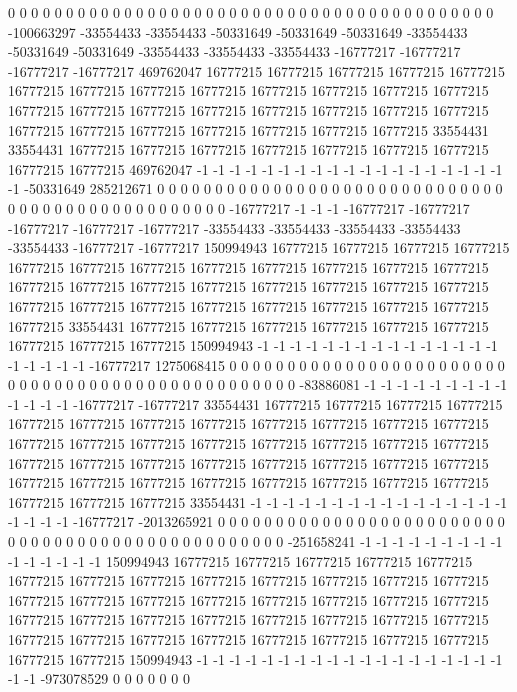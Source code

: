 0 0 0 0 0 0 0 0 0 0 0 0 0 0 0 0 0 0 0 0 0 0 0 0 0 0 0 0 0 0 0 0 0 0 0 0 0 0 0 0 0 0 -100663297 -33554433 -33554433 -50331649 -50331649 -50331649 -33554433 -50331649 -50331649 -33554433 -33554433 -33554433 -16777217 -16777217 -16777217 -16777217 469762047 16777215 16777215 16777215 16777215 16777215 16777215 16777215 16777215 16777215 16777215 16777215 16777215 16777215 16777215 16777215 16777215 16777215 16777215 16777215 16777215 16777215 16777215 16777215 16777215 16777215 16777215 16777215 16777215 33554431 33554431 16777215 16777215 16777215 16777215 16777215 16777215 16777215 16777215 16777215 469762047 -1 -1 -1 -1 -1 -1 -1 -1 -1 -1 -1 -1 -1 -1 -1 -1 -1 -1 -1 -1 -50331649 285212671 0 0 0 0 0 0 0
0 0 0 0 0 0 0 0 0 0 0 0 0 0 0 0 0 0 0 0 0 0 0 0 0 0 0 0 0 0 0 0 0 0 0 0 0 0 0 0 0 0 -16777217 -1 -1 -1 -16777217 -16777217 -16777217 -16777217 -16777217 -33554433 -33554433 -33554433 -33554433 -33554433 -16777217 -16777217 150994943 16777215 16777215 16777215 16777215 16777215 16777215 16777215 16777215 16777215 16777215 16777215 16777215 16777215 16777215 16777215 16777215 16777215 16777215 16777215 16777215 16777215 16777215 16777215 16777215 16777215 16777215 16777215 16777215 16777215 33554431 16777215 16777215 16777215 16777215 16777215 16777215 16777215 16777215 16777215 150994943 -1 -1 -1 -1 -1 -1 -1 -1 -1 -1 -1 -1 -1 -1 -1 -1 -1 -1 -1 -1 -16777217 1275068415 0 0 0 0 0 0 0
0 0 0 0 0 0 0 0 0 0 0 0 0 0 0 0 0 0 0 0 0 0 0 0 0 0 0 0 0 0 0 0 0 0 0 0 0 0 0 0 0 0 -83886081 -1 -1 -1 -1 -1 -1 -1 -1 -1 -1 -1 -1 -1 -16777217 -16777217 33554431 16777215 16777215 16777215 16777215 16777215 16777215 16777215 16777215 16777215 16777215 16777215 16777215 16777215 16777215 16777215 16777215 16777215 16777215 16777215 16777215 16777215 16777215 16777215 16777215 16777215 16777215 16777215 16777215 16777215 16777215 16777215 16777215 16777215 16777215 16777215 16777215 16777215 16777215 16777215 33554431 -1 -1 -1 -1 -1 -1 -1 -1 -1 -1 -1 -1 -1 -1 -1 -1 -1 -1 -1 -1 -16777217 -2013265921 0 0 0 0 0 0 0
0 0 0 0 0 0 0 0 0 0 0 0 0 0 0 0 0 0 0 0 0 0 0 0 0 0 0 0 0 0 0 0 0 0 0 0 0 0 0 0 0 0 -251658241 -1 -1 -1 -1 -1 -1 -1 -1 -1 -1 -1 -1 -1 -1 -1 150994943 16777215 16777215 16777215 16777215 16777215 16777215 16777215 16777215 16777215 16777215 16777215 16777215 16777215 16777215 16777215 16777215 16777215 16777215 16777215 16777215 16777215 16777215 16777215 16777215 16777215 16777215 16777215 16777215 16777215 16777215 16777215 16777215 16777215 16777215 16777215 16777215 16777215 16777215 16777215 150994943 -1 -1 -1 -1 -1 -1 -1 -1 -1 -1 -1 -1 -1 -1 -1 -1 -1 -1 -1 -1 -1 -973078529 0 0 0 0 0 0 0

